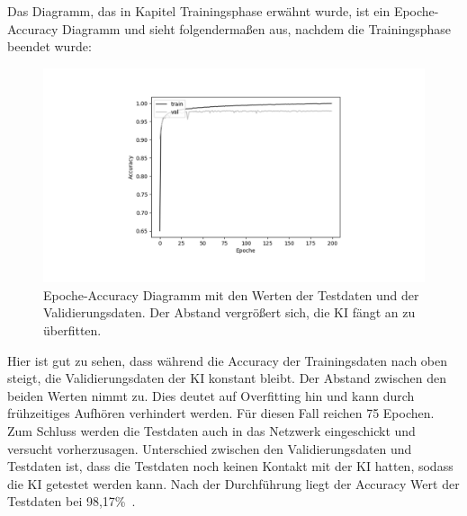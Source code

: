 \documentclass[11pt]{article}
\begin{document}
Das Diagramm, das in Kapitel Trainingsphase erwähnt wurde, ist ein Epoche-Accuracy Diagramm und sieht folgendermaßen aus, nachdem die Trainingsphase
beendet wurde:
\begin{figure}[h]
    \centering
    \includegraphics[width=375pt, keepaspectratio]{images/accuracydiagram}
    \caption[Epoche-Accuracy Diagramm]{Epoche-Accuracy Diagramm mit den Werten der Testdaten und der Validierungsdaten. Der Abstand vergrößert sich,
    die KI fängt an zu überfitten.}
\end{figure}
Hier ist gut zu sehen, dass während die Accuracy der Trainingsdaten nach oben steigt, die Validierungsdaten der KI konstant bleibt. Der Abstand zwischen den
beiden Werten nimmt zu. Dies deutet auf Overfitting hin und kann durch frühzeitiges Aufhören verhindert werden. Für diesen Fall reichen
75 Epochen. Zum Schluss werden die Testdaten auch in das Netzwerk eingeschickt und versucht vorherzusagen. Unterschied zwischen den Validierungsdaten
und Testdaten ist, dass die Testdaten noch keinen Kontakt mit der KI hatten, sodass die KI getestet werden kann.
Nach der Durchführung liegt der Accuracy Wert der Testdaten bei 98,17\%~\cite{9}.
\end{document}
